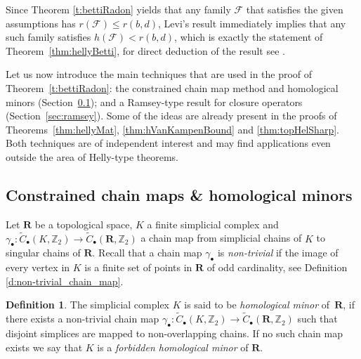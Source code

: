 \documentclass[a4paper,12pt]{amsart}
\theoremstyle{definition}
\newtheorem{definition}[theorem]{Definition}
\begin{document}
Since Theorem \ref{t:bettiRadon}
yields that any family $\mathcal F$ that satisfies the given assumptions has $r(\mathcal F)\leq r(b,d)$, 
Levi's result immediately implies that any such family satisfies $h(\mathcal F)< r(b,d)$,
which is exactly the statement of Theorem~\ref{thm:hellyBetti}, for direct deduction of the result see \cite[Remark 4]{bettiRadon}.


\bigskip
Let us now introduce the main techniques that are used in the proof of Theorem~\ref{t:bettiRadon}:
the constrained chain map method and homological minors (Section~\ref{sec:constrained}); and a Ramsey-type result for closure operators (Section~\ref{sec:ramsey}).
Some of the ideas are already present in the proofs of Theorems~\ref{thm:hellyMat}, \ref{thm:hVanKampenBound} and \ref{thm:topHelSharp}.
Both techniques are of independent interest and may find applications even outside the area of Helly-type theorems.


\subsection{Constrained chain maps \& homological minors}\label{sec:constrained}
Let $\mathbf R$ be a topological space, $K$ a finite simplicial complex and $\gamma_\bullet: \widetilde C_\bullet(K, \mathbb Z_2) \to \widetilde C_\bullet(\mathbf R, \mathbb Z_2)$  a chain map from simplicial chains of $K$ to singular chains of $\mathbf R$. Recall that a chain map $\gamma_\bullet$ is \emph{non-trivial} if the image of every vertex in $K$ is a finite set of points in $\mathbf R$ of odd cardinality, see Definition \ref{d:non-trivial_chain_map}.

\begin{definition}\cite{Uli_HomMinor}
The simplicial complex $K$ is said to be {\em homological minor} of~$\mathbf R$, if there exists a non-trivial chain map $\gamma_\bullet \colon \widetilde C_{\bullet}(K, \mathbb Z_2) \to \widetilde C_{\bullet}(\mathbf R, \mathbb Z_2)$ such that disjoint simplices are mapped to non-overlapping chains. If no such chain map exists we say that $K$ is a {\em forbidden homological minor} of $\mathbf R$.
\end{definition}
\end{document}
